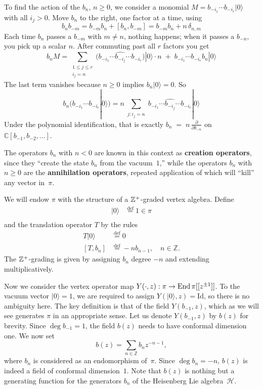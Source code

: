 \documentclass[12pt]{article}
\begin{document}
To find the action of the $b_n$, $n\ge 0$, we consider a monomial $M=b_{-i_1}\cdots b_{-i_r}|0\rangle$ with all $i_j>0$. Move $b_n$ to the right, one factor at a time, using
\[b_n b_{-m}=b_{-m} b_n + [b_n,b_{-m}]
= b_{-m} b_n + n\,\delta_{n,m}\]
Each time $b_n$ passes a $b_{-m}$ with $m\neq n$, nothing happens; when it passes a $b_{-n}$, you pick up a scalar $n$. After commuting past all $r$ factors you get
\[b_n M
= \sum_{\substack{1\le j\le r\\ i_j=n}}
\big(b_{-i_1}\cdots \widehat{b_{-i_j}}\cdots b_{-i_r}\big)|0\rangle
\cdot n \;+\; b_{-i_1}\cdots b_{-i_r} b_n|0\rangle\]
The last term vanishes because $n\ge0$ implies $b_n|0\rangle=0$. So
\[b_n\big(b_{-i_1}\cdots b_{-i_r}|0\rangle\big)
= n\sum_{\substack{j: i_j=n}}
b_{-i_1}\cdots \widehat{b_{-i_j}}\cdots b_{-i_r}|0\rangle\]
Under the polynomial identification, that is exactly
$b_n \;=\; n\,\frac{\partial}{\partial b_{-n}}$
on $\mathbb{C}[b_{-1},b_{-2},\dots]$.


The operators $b_n$ with $n<0$ are known in this context as \textbf{creation operators}, since they ``create the state $b_n$ from the vacuum~$1$,''
while the operators $b_n$ with $n\ge 0$ are the \textbf{annihilation operators}, repeated application of which will ``kill'' any vector in~$\pi$.

We will endow $\pi$ with the structure of a $\mathbb{Z}^+$-graded vertex algebra. Define \begin{align*}
    |0\rangle &\stackrel{\mathrm{def}}{=} 1 \in \pi \\
\end{align*} and the translation operator $T$ by the rules \begin{align*}
    T|0\rangle &\stackrel{\mathrm{def}}{=} 0 \\
    [T,b_n] &\stackrel{\mathrm{def}}{=} -n b_{n-1}, \quad n\in\mathbb{Z}.
\end{align*} The $\mathbb{Z}^+$-grading is given by assigning $b_n$ degree $-n$ and extending multiplicatively. 

Now we consider the vertex operator map $Y(\cdot,z): \pi \to \operatorname{End} \pi[[z^{\pm1}]]$. To the vacuum vector $\lvert 0 \rangle = 1$, we are required to assign $Y(\lvert 0 \rangle, z) = \mathrm{Id}$, so there is no ambiguity here. The key definition is that of the field $Y(b_{-1}, z)$, which as we will see generates $\pi$ in an appropriate sense.
Let us denote $Y(b_{-1}, z)$ by $b(z)$ for brevity.
Since $\deg b_{-1} = 1$, the field $b(z)$ needs to have conformal dimension one.
We now set
\[
b(z) = \sum_{n\in\mathbb{Z}} b_n z^{-n-1},
\]
where $b_n$ is considered as an endomorphism of~$\pi$.
Since $\deg b_n = -n$, $b(z)$ is indeed a field of conformal dimension~$1$.
Note that $b(z)$ is nothing but a generating function for the generators $b_n$ of the Heisenberg Lie algebra~$\mathcal{H}$.
\end{document}
